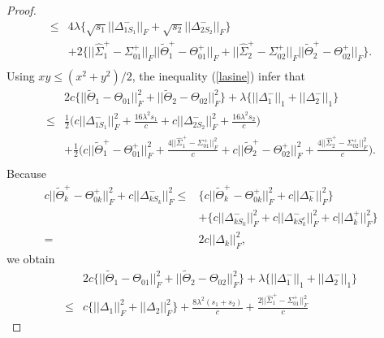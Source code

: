\documentclass[review]{elsarticle}
\newcommand{\1}{{\bf 1}}
\newcommand{\0}{{\bf 0}}
\newtheorem{proof}{Proof}
\begin{document}
\begin{appendices}
\begin{proof}
\begin{equation}
\begin{split}
\leq &4\lambda\Big\{\sqrt{s_1}||\Delta_{1S_1}^{-}||_{F}+\sqrt{s_2}||\Delta_{2S_2}^{-}||_{F}\Big\}\\
&+2\Big\{||\widehat{\Sigma}_{1}^{+}-\Sigma_{01}^{+}||_F||\widetilde{\Theta}_1^{+}-\Theta_{01}^{+}||_{F}
+||\widehat{\Sigma}_{2}^{+}-\Sigma_{02}^{+}||_F||\widetilde{\Theta}_2^{+}-\Theta_{02}^{+}||_{F}\Big\}.\\
\end{split}
\end{equation}
 Using $xy\leq (x^2+y^2)/2$, the inequality (\ref{lasine}) infer that
\begin{equation}
\begin{split}
&2c\Big\{||\widetilde{\Theta}_1-\Theta_{01}||_{F}^{2}+||\widetilde{\Theta}_2-\Theta_{02}||_{F}^{2}\Big\}
+\lambda\Big\{||\Delta_{1}^{-}||_1+||\Delta_{2}^{-}||_1\Big\}\\
\leq
 &\frac{1}{2}\Big(c||\Delta_{1S_1}^{-}||_{F}^{2}+\frac{16\lambda^2s_1}{c}
 +c||\Delta_{2S_2}^{-}||_{F}^{2}+\frac{16\lambda^2s_2}{c}\Big)\\
&+\frac{1}{2}\Big(c||\widetilde{\Theta}_1^{+}-\Theta_{01}^{+}||_{F}^{2}+
\frac{4||\widehat{\Sigma}_{1}^{+}-\Sigma_{01}^{+}||_{F}^{2}}{c}
+c||\widetilde{\Theta}_2^{+}-\Theta_{02}^{+}||_{F}^{2}+
\frac{4||\widehat{\Sigma}_{2}^{+}-\Sigma_{02}^{+}||_{F}^{2}}{c}\Big).\\
\end{split}
\end{equation}
 Because
\begin{equation}\label{equal_39}
\begin{split}
c||\widetilde{\Theta}_k^{+}-\Theta_{0k}^{+}||_{F}^{2}+c||\Delta_{kS_k}^{-}||_{F}^{2}
\leq
&\Big\{c||\widetilde{\Theta}_k^{+}-\Theta_{0k}^{+}||_{F}^{2}+c||\Delta_{k}^{-}||_{F}^{2}\Big\}\\
&+\Big\{c||\Delta_{kS_k}^{-}||_{F}^{2}+c||\Delta_{kS_k^{c}}^{-}||_{F}^{2}+c||\Delta_{k}^{+}||_{F}^{2}\Big\}\\
=&2c||\Delta_{k}||_{F}^{2},
\end{split}
\end{equation}
 we obtain
\begin{equation}
\begin{split}
&2c\Big\{||\widetilde{\Theta}_1-\Theta_{01}||_{F}^{2}+||\widetilde{\Theta}_2-\Theta_{02}||_{F}^{2}\Big\}
+\lambda\Big\{||\Delta_{1}^{-}||_1+||\Delta_{2}^{-}||_1\Big\}\\
\leq &c\Big\{||\Delta_{1}||_{F}^{2}+||\Delta_{2}||_{F}^{2}\Big\}+\frac{8\lambda^2(s_1+s_2)}{c}
+\frac{2||\widehat{\Sigma}_{1}^{+}-\Sigma_{01}^{+}||_{F}^{2}}{c}

\end{split}
\end{equation}
\end{proof}
\end{appendices}
\end{document}
